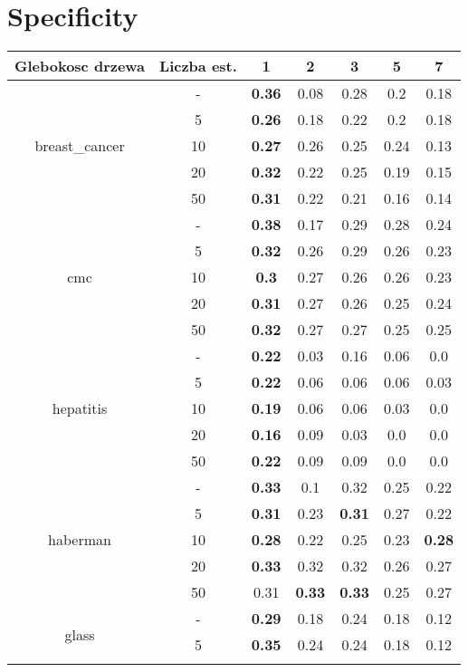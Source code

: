 \documentclass{article}%
\begin{document}
\section*{Specificity}%
\begin{longtable}{c|c|ccccc}%
\hline%
Glebokosc drzewa&Liczba est.&1&2&3&5&7\\%
\hline%
\multirow{5}{*}{breast\_cancer}&{-}&\textbf{0.36}&0.08&0.28&0.2&0.18\\%
\cline{2%
-%
7}%
&5&\textbf{0.26}&0.18&0.22&0.2&0.18\\%
\cline{2%
-%
7}%
&10&\textbf{0.27}&0.26&0.25&0.24&0.13\\%
\cline{2%
-%
7}%
&20&\textbf{0.32}&0.22&0.25&0.19&0.15\\%
\cline{2%
-%
7}%
&50&\textbf{0.31}&0.22&0.21&0.16&0.14\\%
\hline%
\multirow{5}{*}{cmc}&{-}&\textbf{0.38}&0.17&0.29&0.28&0.24\\%
\cline{2%
-%
7}%
&5&\textbf{0.32}&0.26&0.29&0.26&0.23\\%
\cline{2%
-%
7}%
&10&\textbf{0.3}&0.27&0.26&0.26&0.23\\%
\cline{2%
-%
7}%
&20&\textbf{0.31}&0.27&0.26&0.25&0.24\\%
\cline{2%
-%
7}%
&50&\textbf{0.32}&0.27&0.27&0.25&0.25\\%
\hline%
\multirow{5}{*}{hepatitis}&{-}&\textbf{0.22}&0.03&0.16&0.06&0.0\\%
\cline{2%
-%
7}%
&5&\textbf{0.22}&0.06&0.06&0.06&0.03\\%
\cline{2%
-%
7}%
&10&\textbf{0.19}&0.06&0.06&0.03&0.0\\%
\cline{2%
-%
7}%
&20&\textbf{0.16}&0.09&0.03&0.0&0.0\\%
\cline{2%
-%
7}%
&50&\textbf{0.22}&0.09&0.09&0.0&0.0\\%
\hline%
\multirow{5}{*}{haberman}&{-}&\textbf{0.33}&0.1&0.32&0.25&0.22\\%
\cline{2%
-%
7}%
&5&\textbf{0.31}&0.23&\textbf{0.31}&0.27&0.22\\%
\cline{2%
-%
7}%
&10&\textbf{0.28}&0.22&0.25&0.23&\textbf{0.28}\\%
\cline{2%
-%
7}%
&20&\textbf{0.33}&0.32&0.32&0.26&0.27\\%
\cline{2%
-%
7}%
&50&0.31&\textbf{0.33}&\textbf{0.33}&0.25&0.27\\%
\hline%
\multirow{5}{*}{glass}&{-}&\textbf{0.29}&0.18&0.24&0.18&0.12\\%
\cline{2%
-%
7}%
&5&\textbf{0.35}&0.24&0.24&0.18&0.12\\%
\cline{2%
}
\end{longtable}
\end{document}
